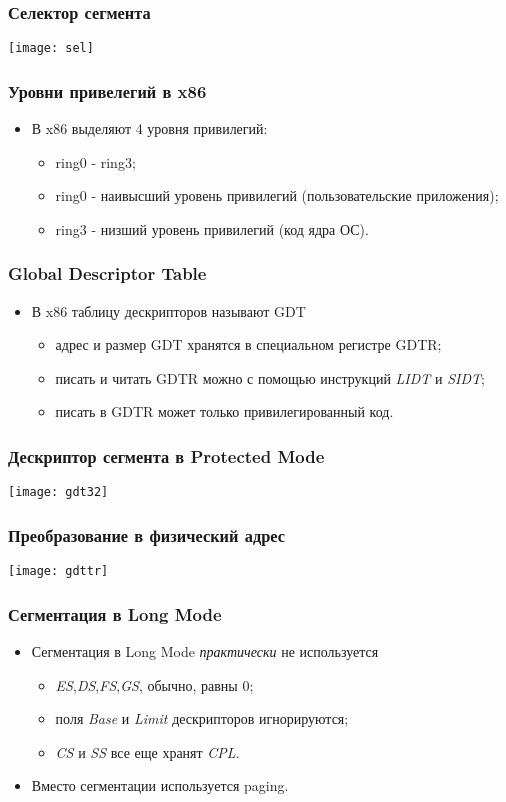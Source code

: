 \begin{frame}
\frametitle{Селектор сегмента}
\texttt{[image: sel]}
\end{frame}

\begin{frame}
\frametitle{Уровни привелегий в x86}
\begin{itemize}
    \item<1->В x86 выделяют 4 уровня привилегий:
    \begin{itemize}
        \item<1->ring0 - ring3;
        \item<2->ring0 - наивысший уровень привилегий (пользовательские
        приложения);
        \item<2->ring3 - низший уровень привилегий (код ядра ОС).
    \end{itemize}
\end{itemize}
\end{frame}

\begin{frame}
\frametitle{Global Descriptor Table}
\begin{itemize}
    \item<1->В x86 таблицу дескрипторов называют GDT
    \begin{itemize}
        \item<2->адрес и размер GDT хранятся в специальном регистре GDTR;
        \item<3->писать и читать GDTR можно с помощью инструкций \emph{LIDT}
        и \emph{SIDT};
        \item<4->писать в GDTR может только привилегированный код.
    \end{itemize}
\end{itemize}
\end{frame}

\begin{frame}
\frametitle{Дескриптор сегмента в Protected Mode}
\texttt{[image: gdt32]}
\end{frame}

\begin{frame}
\frametitle{Преобразование в физический адрес}
\texttt{[image: gdttr]}
\end{frame}

\begin{frame}
\frametitle{Сегментация в Long Mode}
\begin{itemize}
    \item<1->Сегментация в Long Mode \emph{практически} не используется
    \begin{itemize}
       \item<2->\emph{ES},\emph{DS},\emph{FS},\emph{GS}, обычно, равны 0;
       \item<3->поля \emph{Base} и \emph{Limit} дескрипторов игнорируются;
       \item<4->\emph{CS} и \emph{SS} все еще хранят \emph{CPL}.
    \end{itemize}
    \item<5->Вместо сегментации используется paging.
\end{itemize}
\end{frame}

